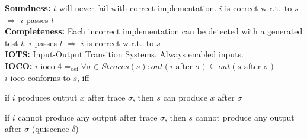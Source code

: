 \textbf{Soundness:} $t$ will never fail with correct implementation. $i$ is correct w.r.t.\ to $s$ $\Rightarrow$ $i$ passes $t$\\
\textbf{Completeness:} Each incorrect implementation can be detected with a generated test $t$. $i$ passes $t$ $\Rightarrow$ $i$ is correct w.r.t.\ to $s$\\
\textbf{IOTS:} Input-Output Transition Systems. Always enabled inputs.\\
\textbf{IOCO:} $i \text{ ioco } 4 =_{\text{def}} \forall \sigma \in Straces(s): out(i \text{ after } \sigma) \subseteq out(s \text{ after } \sigma)$\\
$i$ ioco-conforms to $s$, iff
\begin{itemize*}
    \item if $i$ produces output $x$ after trace $\sigma$, then $s$ can produce $x$ after $\sigma$
    \item if $i$ cannot produce any output after trace $\sigma$, then $s$ cannot produce any output after $\sigma$ (quiscence $\delta$)
\end{itemize*}

